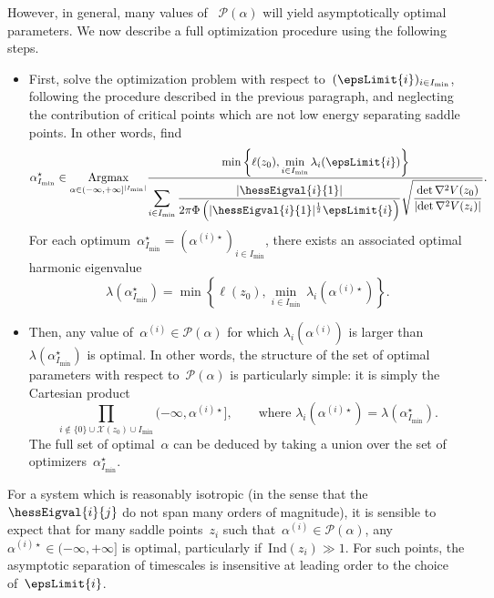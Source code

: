     However, in general, many values of ~$\mathcal P(\alpha)$ will yield asymptotically optimal parameters. We now describe a full optimization procedure using the following steps.
    \begin{itemize}
        \item{First, solve the optimization problem with respect to~$(\epsLimit{i})_{i\in I_{\min}}$, following the procedure described in the previous paragraph, and neglecting the contribution of critical points which are not low energy separating saddle points. In other words, find
        \begin{equation}
            \label{02:eq:reduced_opt_problem}
            \alpha^{\star}_{I_{\min}}\in\underset{\alpha\in (-\infty,+\infty]^{|I_{\min}|}}{\mathrm{Argmax}}\frac{\displaystyle\min\left\{\ell(z_0),\underset{i\in I_{\min}}{\min}\,\lambda_i(\epsLimit{i})\right\}}{\displaystyle\sum_{i\in I_{\min}} \frac{|\hessEigval{i}{1}|}{2\pi\Phi\left(|\hessEigval{i}{1}|^{\frac12}\epsLimit{i}\right)}\sqrt{\frac{\det \nabla^2 V(z_0)}{\left|\det \nabla ^2 V(z_i)\right|}}}.
        \end{equation}
        For each optimum~$\alpha^{\star}_{I_{\min}} =(\alpha^{(i)\star})_{i\in I_{\min}}$, there exists an associated optimal harmonic eigenvalue
        \[\lambda\left(\alpha^{\star}_{I_{\min}}\right) = \min\left\{\ell(z_0),\underset{i\in I_{\min}}{\min}\,\lambda_i(\alpha^{(i)\star})\right\}.\]}
        \item{Then, any value of~$\alpha^{(i)}\in\mathcal P(\alpha)$ for which $\lambda_i(\alpha^{(i)})$ is larger than~$\lambda(\alpha^\star_{I_{\min}})$ is optimal. In other words, the structure of the set of optimal parameters with respect to~$\mathcal P(\alpha)$ is particularly simple: it is simply the Cartesian product
    \[\prod_{i\not\in \{0\}\cup\mathcal X(z_0)\cup I_{\min}} (-\infty,\alpha^{(i)\star}],\qquad \text{where }\lambda_i(\alpha^{(i)\star})=\lambda(\alpha^{\star}_{I_{\min}}).\]}
    The full set of optimal~$\alpha$ can be deduced by taking a union over the set of optimizers~$\alpha^{\star}_{I_{\min}}$.
    \end{itemize}

    For a system which is reasonably isotropic (in the sense that the~$\hessEigval{i}{j}$ do not span many orders of magnitude), it is sensible to expect that for many saddle points~$z_i$ such that~$\alpha^{(i)}\in \mathcal P(\alpha)$, any~$\alpha^{(i)\star}\in(-\infty,+\infty]$ is optimal, particularly if~$\mathrm{Ind}(z_i)\gg 1$. For such points, the asymptotic separation of timescales is insensitive at leading order to the choice of~$\epsLimit{i}$.

